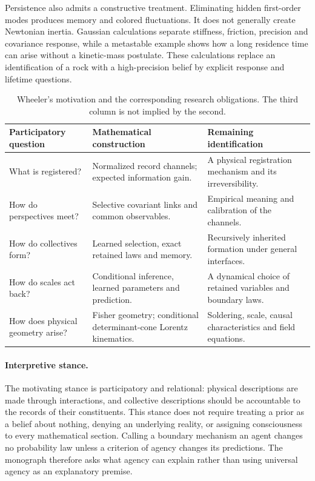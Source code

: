 Persistence also admits a constructive treatment. Eliminating hidden first-order modes produces memory and colored fluctuations. It does not generally create Newtonian inertia. Gaussian calculations separate stiffness, friction, precision and covariance response, while a metastable example shows how a long residence time can arise without a kinetic-mass postulate. These calculations replace an identification of a rock with a high-precision belief by explicit response and lifetime questions.

\begin{table}[ht]
\centering\small
\begin{tabularx}{\textwidth}{@{}p{}XX@{}}
\toprule
Participatory question & Mathematical construction & Remaining identification\\
\midrule
What is registered? & Normalized record channels; expected information gain. & A physical registration mechanism and its irreversibility.\\
How do perspectives meet? & Selective covariant links and common observables. & Empirical meaning and calibration of the channels.\\
How do collectives form? & Learned selection, exact retained laws and memory. & Recursively inherited formation under general interfaces.\\
How do scales act back? & Conditional inference, learned parameters and prediction. & A dynamical choice of retained variables and boundary laws.\\
How does physical geometry arise? & Fisher geometry; conditional determinant-cone Lorentz kinematics. & Soldering, scale, causal characteristics and field equations.\\
\bottomrule
\end{tabularx}
\caption{Wheeler's motivation and the corresponding research obligations. The third column is not implied by the second.}\label{tab:wheeler_correspondence}
\end{table}

\paragraph{Interpretive stance.}\label{sec:cognitive_first}
The motivating stance is participatory and relational: physical descriptions are made through interactions, and collective descriptions should be accountable to the records of their constituents. This stance does not require treating a prior as a belief about nothing, denying an underlying reality, or assigning consciousness to every mathematical section. Calling a boundary mechanism an agent changes no probability law unless a criterion of agency changes its predictions. The monograph therefore asks what agency can explain rather than using universal agency as an explanatory premise.

